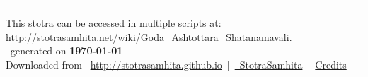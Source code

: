 \documentclass[a5paper,twoside,12pt]{book}
\begin{document}
\setmainfont[Script=Devanagari,Mapping=tex-text]{Sanskrit 2003}
\fontsize {16}{19.25}\selectfont
\let\head\chapt
\begin{center}

\end{center}
\vfill
\centering
\rule{0.8\textwidth}{0.6pt}

\footnotesize
{}\sffamily
This stotra can be accessed in multiple scripts at:\\
\url{http://stotrasamhita.net/wiki/Goda_Ashtottara_Shatanamavali}.\\[1ex]
\faFilePdfO~generated on \textbf{\today}\\[1ex]
Downloaded from \faGlobe{}~\url{http://stotrasamhita.github.io}~|~\href{https://github.com/StotraSamhita}{\faGithubSquare{}~StotraSamhita}~|~\href{https://stotrasamhita.github.io/about/}{Credits}
\end{document}
